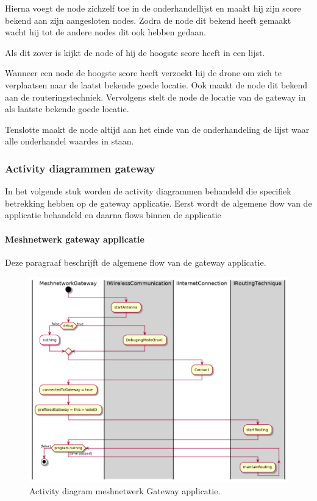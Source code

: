 \documentclass[a4paper, 11pt, oneside]{report}
\begin{document}
Hierna voegt de node zichzelf toe in de onderhandellijst en maakt hij zijn score bekend aan zijn aangesloten nodes.
Zodra de node dit bekend heeft gemaakt wacht hij tot de andere nodes dit ook hebben gedaan.

Als dit zover is kijkt de node of hij de hoogste score heeft in een lijst.

Wanneer een node de hoogste score heeft verzoekt hij de drone om zich te verplaatsen naar de laatst bekende goede locatie. Ook maakt de node dit bekend aan de routeringstechniek. 
Vervolgens stelt de node de locatie van de gateway in als laatste bekende goede locatie.

Tenslotte maakt de node altijd aan het einde van de onderhandeling de lijst waar alle onderhandel waardes in staan. 

\subsubsection{Activity diagrammen gateway}
\label{DetailedDesign:Communicatie:Activity:gateway}
In het volgende stuk worden de activity diagrammen behandeld die specifiek betrekking hebben op de gateway applicatie. Eerst wordt de algemene flow van de applicatie behandeld en daarna flows binnen de applicatie

\paragraph{Meshnetwerk gateway applicatie}
Deze paragraaf beschrijft de algemene flow van de gateway applicatie. 
\label{DetailedDesign:Communicatie:Activity:gateway:applicatie}
\begin{figure}[H]
	\begin{center}\includegraphics[width=.8\linewidth]{UML/out/Communication/activity/MeshGateway/MeshGateway.png}\end{center}
	\caption{Activity diagram meshnetwerk Gateway applicatie.}
	\label{fig:communication:activity:gateway}
\end{figure}
\end{document}
